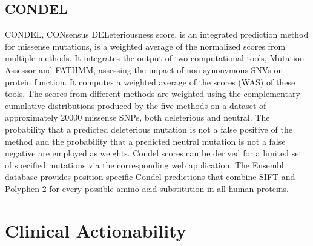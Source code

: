 \documentclass{article}
\begin{document}
\subsection{CONDEL}

CONDEL, CONsensus DELeteriousness score, is an integrated prediction
method for missense mutations, is a weighted average of the normalized
scores from multiple methods. It integrates the output of two
computational tools, Mutation Assessor and FATHMM, assessing the
impact of non synonymous SNVs on protein function. It computes a
weighted average of the scores (WAS) of these tools. The scores from
different methods are weighted using the complementary cumulative
distributions produced by the five methods on a dataset of
approximately 20000 missense SNPs, both deleterious and neutral. The
probability that a predicted deleterious mutation is not a false
positive of the method and the probability that a predicted neutral
mutation is not a false negative are employed as weights. Condel
scores can be derived for a limited set of specified mutations via the
corresponding web application. The Ensembl database provides
position-specific Condel predictions that combine SIFT and Polyphen-2
for every possible amino acid substitution in all human proteins.

\section{Clinical Actionability}
\end{document}
